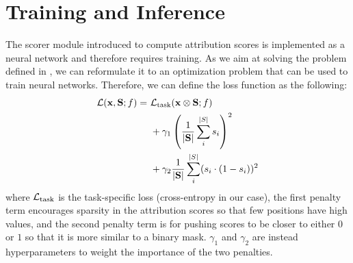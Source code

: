 \section{Training and Inference}

The scorer module introduced to compute attribution scores is implemented as a neural network and therefore requires training. As we aim at solving the problem defined in , we can reformulate it to an optimization problem that can be used to train neural networks. Therefore, we can define the loss function as the following:
\begin{equation}
    \label{eq:loss_naive}
    \begin{aligned}
        {\ensuremath{\mathcal{L}}}({\mathbf{x}}, {\mathbf{S}}; f) =\,\, &{\mathcal{L}}_\text{task}({\mathbf{x}} \otimes {\ensuremath{\mathbf{S}}}; f) \\
        &+ \gamma_1 \left( \frac{1}{\vert {\ensuremath{\mathbf{S}}} \vert} \sum_i^{\vert S \vert} s_i \right)^2 \\
        &+ \gamma_2 \frac{1}{\vert {\ensuremath{\mathbf{S}}} \vert} \sum_i^{\vert S \vert} (s_i \cdot (1-s_i))^2 \\
    \end{aligned}
\end{equation} 
where ${\mathcal{L}}_\text{task}$ is the task-specific loss (cross-entropy in our case), the first penalty term encourages sparsity in the attribution scores so that few positions have high values, and the second penalty term is for pushing scores to be closer to either $0$ or $1$ so that it is more similar to a binary mask. $\gamma_1$ and $\gamma_2$ are instead hyperparameters to weight the importance of the two penalties. 

